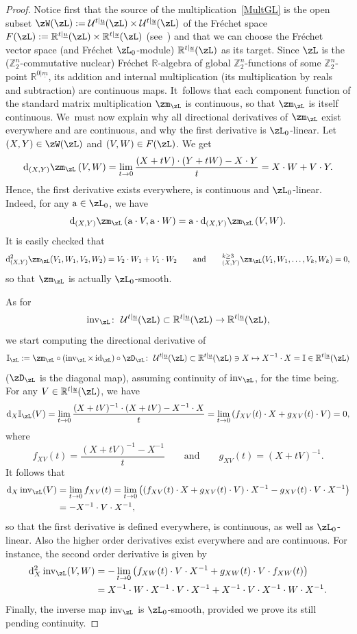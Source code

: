 \documentclass[10pt,a4paper]{amsart}
\newcommand{\op}[1]{\operatorname{#1}}
\newcommand{\R}{{\mathbb R}}
\newcommand{\Z}{{\mathbb Z}}
\def\ul{\underline}
\def\cU{\mathcal{U}}
\def\ul{\underline}
\newcommand{\0}{\otimes}
\newcommand{\id}{\op{id}}
\newcommand{\z}{\Z_2^n}
\numberwithin{equation}{section}
\begin{document}
\begin{proof}
Notice first that the source of the multiplication~\eqref{MultGL} is the open subset $\zW(\zL):=\cU^{t|\ul u}(\zL)\times\cU^{t|\ul u}(\zL)$ of the Fr\'echet space $F(\zL):=\R^{t|\ul u}(\zL)\times\R^{t|\ul u}(\zL)$ (see~\cite{Bruce:2019b}) and that we can choose the Fr\'echet vector space (and Fr\'echet $\zL_0$-module) $\R^{t|\ul u}(\zL)$ as its target. Since $\zL$ is the ($\z$-commutative nuclear) Fr\'echet $\R$-algebra of global $\z$-functions of some $\z$-point $\R^{0|\ul m}$, its addition and internal multiplication (its multiplication by reals and subtraction) are continuous maps. It~follows that each component function of the standard matrix multiplication $\zm_\zL$ is continuous, so that $\zm_\zL$ is itself continuous. We~must now explain why all directional derivatives of $\zm_\zL$ exist everywhere and are continuous, and why the first derivative is $\zL_0$-linear. Let $(X,Y)\in\zW(\zL)$ and $(V,W)\in F(\zL)$. We get
\[
{\rm d}_{(X,Y)}\zm_\zL\,(V,W)=\lim_{t\to 0}\frac{(X+tV)\cdot(Y+tW)-X\cdot Y}{t}=X\cdot W+V\cdot Y.
\]
Hence, the first derivative exists everywhere, is continuous and $\zL_0$-linear. Indeed, for any ${\rm a}\in\zL_0$, we have
\[
{\rm d}_{(X,Y)}\zm_\zL\,({\rm a}\cdot V,{\rm a}\cdot W)={\rm a}\cdot {\rm d}_{(X,Y)}\zm_\zL\,(V,W).
\]
It is easily checked that
\[
{\rm d}^2_{(X,Y)}\zm_\zL(V_1,W_1,V_2,W_2)=V_2\cdot W_1+V_1\cdot W_2\qquad\text{and}\qquad
{\rm }^{k\ge 3}_{(X,Y)}\zm_\zL(V_1,W_1,\dots,V_k,W_k)=0,
\]
so that $\zm_\zL$ is actually $\zL_0$-smooth.

As for
\[
\op{inv}_\zL\colon\ \cU^{t|\ul u}(\zL)\subset\R^{t|\ul u}(\zL)\to \R^{t|\ul u}(\zL),
\]
we start computing the directional derivative of
\[
\mathbb{I}_\zL:=\zm_\zL \circ (\op{inv}_\zL\times\id_\zL)\circ\zD_\zL\colon\ \cU^{t|\ul u}(\zL)\subset\R^{t|\ul u}(\zL)\ni X\mapsto X^{-1}\cdot X=\mathbb{I}\in\R^{t|\ul u}(\zL)
\]
($\zD_\zL$ is the diagonal map), assuming continuity of $\op{inv}_\zL$, for the time being. For any $V\in\R^{t|\ul u}(\zL)$, we have
\[
{\rm d}_X\mathbb{I}_\zL(V)=\lim_{t\to 0}\frac{(X+tV)^{-1}\cdot (X+tV)-X^{-1}\cdot X}{t}=\lim_{t\to 0}\left(f_{XV}(t)\cdot X +g_{XV}(t)\cdot V\right)=0,
\]
where
\[
f_{XV}(t)=\frac{(X+tV)^{-1}-X^{-1}}{t}\qquad\text{and}\qquad g_{XV}(t)=(X+tV)^{-1}.
\]
It follows that
\begin{align*}
{\rm d}_X\op{inv}_\zL(V)&=\lim_{t\to 0}f_{XV}(t)=\lim_{t\to 0}\big((f_{XV}(t)\cdot X+g_{XV}(t)\cdot V)\cdot X^{-1}-g_{XV}(t)\cdot V\cdot X^{-1}\big)
\\
&=-X^{-1}\cdot V\cdot X^{-1},
\end{align*}
so that the first derivative is defined everywhere, is continuous, as well as $\zL_0$-linear. Also the higher order derivatives exist everywhere and are continuous. For instance, the second order derivative is given by
\begin{align*}
{\rm d}^2_X\op{inv}_\zL(V,W)&=-\lim_{t\to 0}\big(f_{XW}(t)\cdot V\cdot X^{-1}+g_{XW}(t)\cdot V\cdot f_{XW}(t)\big)\nonumber \\ &=X^{-1}\cdot W\cdot X^{-1}\cdot V\cdot X^{-1}+X^{-1}\cdot V\cdot X^{-1}\cdot W\cdot X^{-1}.
\end{align*}
Finally, the inverse map $\op{inv}_\zL$ is $\zL_0$-smooth, provided we prove its still pending continuity.


\end{proof}
\end{document}
